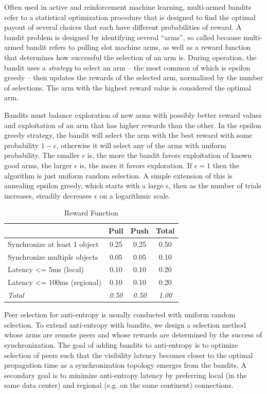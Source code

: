 Often used in active and reinforcement machine learning, multi-armed bandits
refer to a statistical optimization procedure that is
designed to find the optimal payout of several choices that each have
different probabilities of reward.
A bandit problem is designed by identifying several ``arms'', so called
because multi-armed bandit refers to pulling slot machine arms, as well as a
reward function that determines how successful the selection of an arm is.
During operation, the bandit uses a \textit{strategy} to select an arm -- the
most common of which is epsilon greedy -- then updates the rewards of the
selected arm, normalized by the number of selections.
The arm with the highest reward value is considered the optimal arm.

Bandits must balance exploration of new arms with possibly better reward
values and exploitation of an arm that has higher rewards than the other.
In the epsilon greedy strategy, the bandit will select the arm with the best
reward with some probability $1-\epsilon$, otherwise it will select any of the
arms with uniform probability.
The smaller $\epsilon$ is, the more the bandit favors exploitation of known
good arms, the larger $\epsilon$ is, the more it favors exploration.
If $\epsilon=1$ then the algorithm is just uniform random selection.
A simple extension of this is annealing epsilon greedy, which starts with a large $\epsilon$, then as the number of trials increases, steadily decreases
$\epsilon$ on a logarithmic scale.

\begin{table}[]
\centering
\begin{tabular}{@{}l c c c @{}}
\toprule
& \textbf{Pull} & \textbf{Push} & \textbf{Total} \\
\midrule
Synchronize at least 1 object & 0.25 & 0.25 & 0.50 \\
Synchronize multiple objects  & 0.05 & 0.05 & 0.10 \\
Latency <= 5ms (local)        & 0.10 & 0.10 & 0.20 \\
Latency <= 100ms (regional)   & 0.10 & 0.10 & 0.20 \\
\midrule
\textit{Total} & \textit{0.50} & \textit{0.50} & \textit{1.00} \\
\bottomrule
\end{tabular}
\caption{Reward Function}
\label{tab:rewards}
\end{table}

Peer selection for anti-entropy is usually conducted with uniform random
selection.
To extend anti-entropy with bandits, we design a selection method whose arms
are remote peers and whose rewards are determined by the success of
synchronization.
The goal of adding bandits to anti-entropy is to optimize selection of peers
such that the visibility latency becomes closer to the optimal propagation
time as a synchronization topology emerges from the bandits.
A secondary goal is to minimize anti-entropy latency by preferring local (in
the same data center) and regional (e.g. on the same continent) connections.


